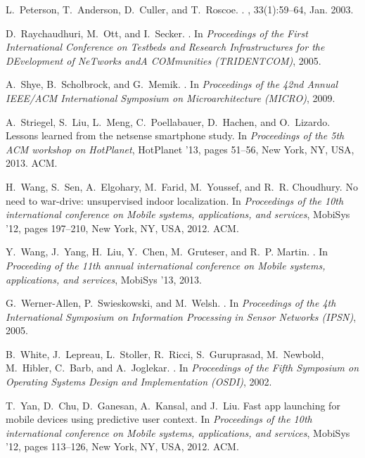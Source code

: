 \begin{thebibliography}{10}
L.~Peterson, T.~Anderson, D.~Culler, and T.~Roscoe.
.
, 33(1):59--64, Jan. 2003.

D.~Raychaudhuri, M.~Ott, and I.~Secker.
.
\newblock In {\em Proceedings of the First International Conference on Testbeds
  and Research Infrastructures for the DEvelopment of NeTworks andA COMmunities
  (TRIDENTCOM)}, 2005.

A.~Shye, B.~Scholbrock, and G.~Memik.
.
\newblock In {\em Proceedings of the 42nd Annual IEEE/ACM International
  Symposium on Microarchitecture (MICRO)}, 2009.

A.~Striegel, S.~Liu, L.~Meng, C.~Poellabauer, D.~Hachen, and O.~Lizardo.
\newblock Lessons learned from the netsense smartphone study.
\newblock In {\em Proceedings of the 5th ACM workshop on HotPlanet}, HotPlanet
  '13, pages 51--56, New York, NY, USA, 2013. ACM.

H.~Wang, S.~Sen, A.~Elgohary, M.~Farid, M.~Youssef, and R.~R. Choudhury.
\newblock No need to war-drive: unsupervised indoor localization.
\newblock In {\em Proceedings of the 10th international conference on Mobile
  systems, applications, and services}, MobiSys '12, pages 197--210, New York,
  NY, USA, 2012. ACM.

Y.~Wang, J.~Yang, H.~Liu, Y.~Chen, M.~Gruteser, and R.~P. Martin.
.
\newblock In {\em Proceeding of the 11th annual international conference on
  Mobile systems, applications, and services}, MobiSys '13, 2013.

G.~Werner-Allen, P.~Swieskowski, and M.~Welsh.
.
\newblock In {\em Proceedings of the 4th International Symposium on Information
  Processing in Sensor Networks (IPSN)}, 2005.

B.~White, J.~Lepreau, L.~Stoller, R.~Ricci, S.~Guruprasad, M.~Newbold,
  M.~Hibler, C.~Barb, and A.~Joglekar.
.
\newblock In {\em Proceedings of the Fifth Symposium on Operating Systems
  Design and Implementation (OSDI)}, 2002.

T.~Yan, D.~Chu, D.~Ganesan, A.~Kansal, and J.~Liu.
\newblock Fast app launching for mobile devices using predictive user context.
\newblock In {\em Proceedings of the 10th international conference on Mobile
  systems, applications, and services}, MobiSys '12, pages 113--126, New York,
  NY, USA, 2012. ACM.

\end{thebibliography}

